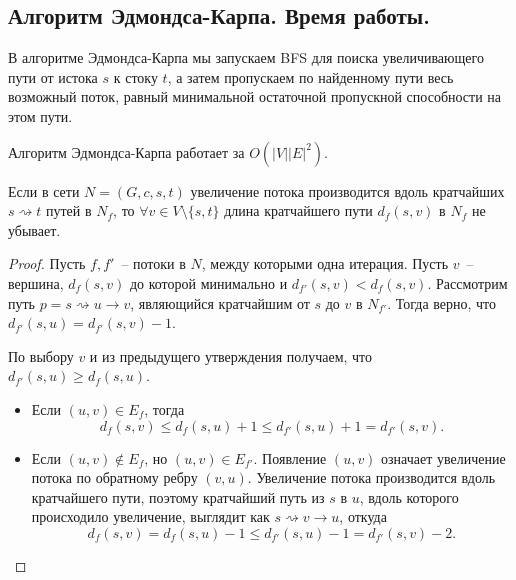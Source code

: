 \documentclass[a4paper,14pt]{article}
\begin{document}
    \subsection{Алгоритм Эдмондса-Карпа. Время работы.}
    В алгоритме Эдмондса-Карпа мы запускаем BFS для поиска увеличивающего пути от истока $s$ к стоку $t$, а затем пропускаем по найденному пути весь возможный поток, равный минимальной остаточной пропускной способности на этом пути.
    \begin{theorem}
        Алгоритм Эдмондса-Карпа работает за $O(|V||E|^2)$.
    \end{theorem}
    \begin{lemma}
        Если в сети $N = (G,c,s,t)$ увеличение потока производится вдоль
кратчайших $s\rightsquigarrow t$ путей в $N_f$, то $\forall v \in V \setminus \{s,t\}$ длина кратчайшего пути $d_f(s,v)$ в $N_f$ не убывает.
    \end{lemma}
    \begin{proof}
        Пусть $f, f'$~-- потоки в $N$, между которыми одна итерация. Пусть $v$~-- вершина, $d_f(s, v)$ до которой минимально и $d_{f'}(s, v) < d_f(s, v)$. Рассмотрим путь $p = s \rightsquigarrow u \to v$, являющийся кратчайшим от $s$ до $v$ в $N_{f'}$. Тогда верно, что $d_{f'}(s, u) = d_{f'}(s, v) - 1$.

По выбору $v$ и из предыдущего утверждения получаем, что
$d_{f'}(s, u) \geq d_f(s, u)$.
        \begin{itemize}
            \item Если $(u, v) \in E_f$, тогда
            \[
            d_f(s, v) \leq d_f(s, u) + 1 \leq d_{f'}(s, u) + 1 = d_{f'}(s, v).
            \]
            
            \item Если $(u, v) \notin E_f$, но $(u, v) \in E_{f'}$. Появление $(u, v)$ означает увеличение потока по обратному ребру $(v, u)$. Увеличение потока производится вдоль кратчайшего пути, поэтому кратчайший путь из $s$ в $u$, вдоль которого происходило увеличение, выглядит как $s \rightsquigarrow v \to u$, откуда
            \[
            d_f(s, v) = d_f(s, u) - 1 \leq d_{f'}(s, u) - 1 = d_{f'}(s, v) - 2.
            \]            
        \end{itemize}
    \end{proof}
\end{document}
